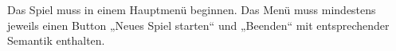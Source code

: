 Das Spiel \gameTitle muss in einem Hauptmenü beginnen. Das Menü muss mindestens jeweils einen Button „Neues Spiel starten“ und „Beenden“ mit entsprechender Semantik enthalten.